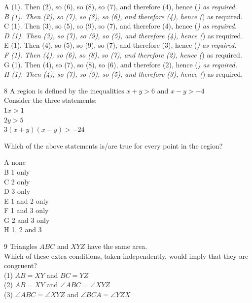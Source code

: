 \documentclass[10pt]{article}
\begin{document}
A (1). Then (2), so (6), so (8), so (7), and therefore (4), hence (\textit{) as required.\\
B (1). Then (2), so (7), so (8), so (6), and therefore (4), hence (}) as required.\\
C (1). Then (3), so (5), so (9), so (7), and therefore (4), hence (\textit{) as required.\\
D (1). Then (3), so (7), so (9), so (5), and therefore (4), hence (}) as required.\\
E (1). Then (4), so (5), so (9), so (7), and therefore (3), hence (\textit{) as required.\\
F (1). Then (4), so (6), so (8), so (7), and therefore (2), hence (}) as required.\\
G (1). Then (4), so (7), so (8), so (6), and therefore (2), hence (\textit{) as required.\\
H (1). Then (4), so (7), so (9), so (5), and therefore (3), hence (}) as required.

8 A region is defined by the inequalities $x+y>6$ and $x-y>-4$\\
Consider the three statements:\\
$1 x>1$\\
$2 y>5$\\
$3(x+y)(x-y)>-24$

Which of the above statements is/are true for every point in the region?

A none\\
B 1 only\\
C 2 only\\
D 3 only\\
E 1 and 2 only\\
F 1 and 3 only\\
G 2 and 3 only\\
H 1, 2 and 3

9 Triangles $A B C$ and $X Y Z$ have the same area.\\
Which of these extra conditions, taken independently, would imply that they are congruent?\\
(1) $A B=X Y$ and $B C=Y Z$\\
(2) $A B=X Y$ and $\angle A B C=\angle X Y Z$\\
(3) $\angle A B C=\angle X Y Z$ and $\angle B C A=\angle Y Z X$
\end{document}
